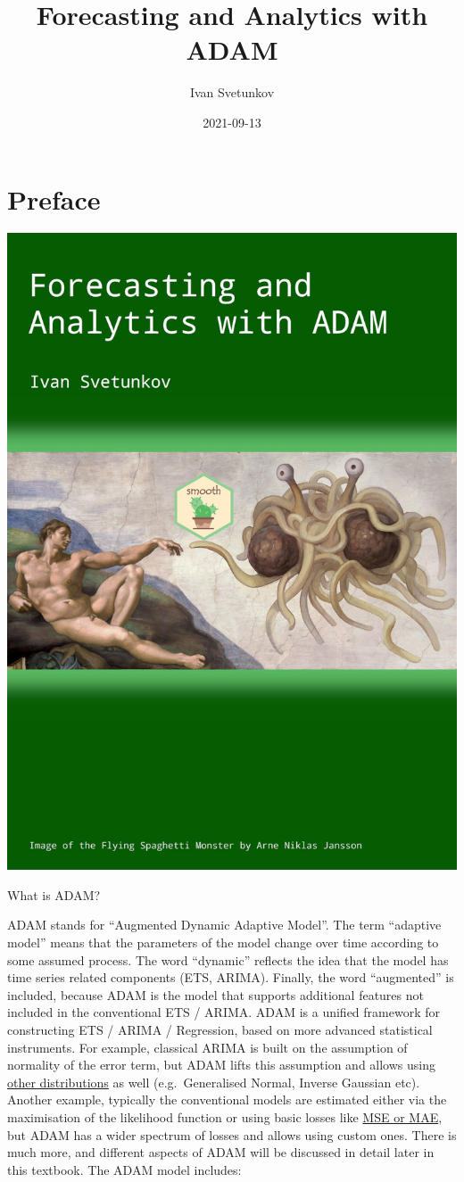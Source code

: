 \documentclass[
]{book}
\title{Forecasting and Analytics with ADAM}
\author{Ivan Svetunkov}
\date{2021-09-13}
\theoremstyle{definition}
\theoremstyle{definition}
\theoremstyle{definition}
\theoremstyle{definition}
\theoremstyle{remark}
\begin{document}
\maketitle

{
\setcounter{tocdepth}{1}
\tableofcontents
}
\hypertarget{preface}{%
\chapter*{Preface}\label{preface}}

\begin{center}\includegraphics[width=0.6\linewidth]{images/Adam-Title-web} \end{center}

What is ADAM?

ADAM stands for ``Augmented Dynamic Adaptive Model''. The term ``adaptive model'' means that the parameters of the model change over time according to some assumed process. The word ``dynamic'' reflects the idea that the model has time series related components (ETS, ARIMA). Finally, the word ``augmented'' is included, because ADAM is the model that supports additional features not included in the conventional ETS / ARIMA. ADAM is a unified framework for constructing ETS / ARIMA / Regression, based on more advanced statistical instruments. For example, classical ARIMA is built on the assumption of normality of the error term, but ADAM lifts this assumption and allows using \protect\hyperlink{distributions}{other distributions} as well (e.g.~Generalised Normal, Inverse Gaussian etc). Another example, typically the conventional models are estimated either via the maximisation of the likelihood function or using basic losses like \protect\hyperlink{errorMeasures}{MSE or MAE}, but ADAM has a wider spectrum of losses and allows using custom ones. There is much more, and different aspects of ADAM will be discussed in detail later in this textbook. The ADAM model includes:
\end{document}
